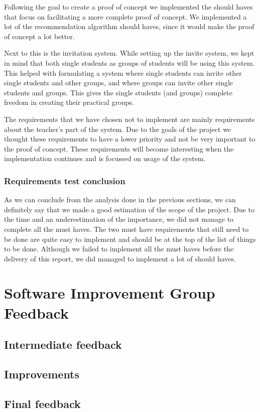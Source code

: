 Following the goal to create a proof of concept we implemented the should haves that focus on facilitating a more complete proof of concept.
We implemented a lot of the recommendation algorithm should haves, since it would make the proof of concept a lot better.

Next to this is the invitation system.
While setting up the invite system, we kept in mind that both single students as groups of students will be using this system.
This helped with formulating a system where single students can invite other single students and other groups, and where groups can invite other single students and groups.
This gives the single students (and groups) complete freedom in creating their practical groups.

The requirements that we have chosen not to implement are mainly requirements about the teacher's part of the system.
Due to the goals of the project we thought these requirements to have a lower priority and not be very important to the proof of concept.
These requirements will become interesting when the implementation continues and is focussed on usage of the system.

\subsubsection{Requirements test conclusion}
As we can conclude from the analysis done in the previous sections, we can definitely say that we made a good estimation of the scope of the project.
Due to the time and an underestimation of the importance, we did not manage to complete all the must haves.
The two must have requirements that still need to be done are quite easy to implement and should be at the top of the list of things to be done.
Although we failed to implement all the must haves before the delivery of this report, we did managed to implement a lot of should haves.

\section{Software Improvement Group Feedback}
\subsection{Intermediate feedback}
\subsection{Improvements}
\subsection{Final feedback}


